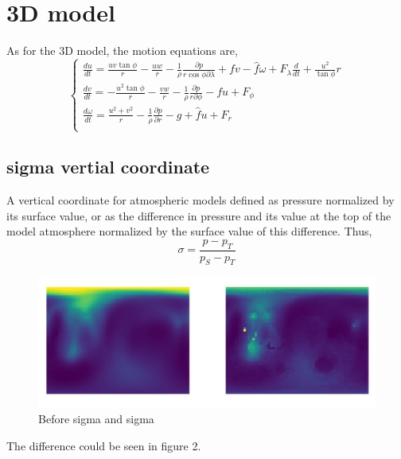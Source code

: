 \documentclass{article}
\begin{document}
\begin{sloppypar}
\section{3D model}
As for the 3D model, the motion equations are,
\begin{equation}
    \begin{cases}
        \frac{du}{dt}=\frac{uv\tan\phi}{r}-\frac{uw}{r}-\frac{1}{\rho}\frac{\partial p}{r\cos\phi\partial\lambda}+fv-\hat{f}\omega+F_{\lambda}\frac{d}{dt}+\frac{u^2}{\tan\phi}{r}
        \\ \frac{dv}{dt}=-\frac{u^2\tan\phi}{r}-\frac{vw}{r}-\frac{1}{\rho}\frac{\partial p}{r\partial \phi}-fu+F_{\phi} \\
        \frac{d\omega}{dt}=\frac{u^2+v^2}{r}-\frac{1}{\rho}\frac{\partial p}{\partial r}-g+\hat{f}u+F_r \\
    \end{cases}
\end{equation}
\subsection{sigma vertial coordinate}
A vertical coordinate for atmospheric models defined as pressure normalized by
its surface value, or as the difference in pressure and its value at the top of
the model atmosphere normalized by the surface value of this difference.
\newline Thus,
\begin{equation}
    \sigma=\frac{p-p_T}{p_S-p_T}
\end{equation}

\begin{figure}
    \centering
    \includegraphics[scale=0.45]{../imgs/wiki/sigma_diff.JPG}
    \caption{Before sigma and sigma}
    \label{fig:2}
\end{figure}
The difference could be seen in figure 2.

\end{sloppypar}
\end{document}
